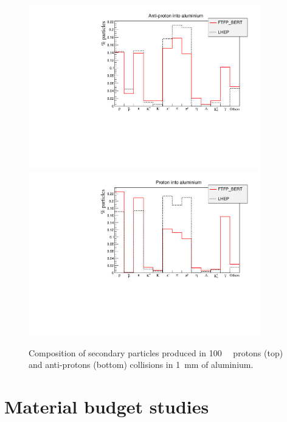 \begin{center}
\begin{figure}[h!]
\centering \includegraphics[width=0.9\textwidth]{Detector/figs/validation/perc_pbarcomp.pdf}
\includegraphics[width=0.9\textwidth]{Detector/figs/validation/perc_pcomp.pdf}
\caption{Composition of secondary particles produced in 100~\gev~ protons (top)
and anti-protons (bottom) collisions in 1~mm of aluminium.}
\label{fig:IDs_valdation}
\end{figure}
\end{center}

\clearpage
\section{Material budget studies}


